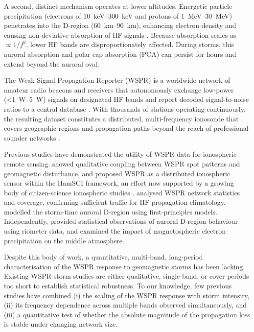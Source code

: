 \documentclass{agujournal2019}
\begin{document}
A second, distinct mechanism operates at lower altitudes. Energetic particle
precipitation (electrons of \SIrange{10}{300}{keV} and protons of
\SIrange{1}{30}{MeV}) penetrates into the D-region (\SIrange{60}{90}{km}),
enhancing electron density and causing non-deviative absorption of HF signals
\citep{hargreaves1969,reid1974}. Because absorption scales as $\propto
	1/f^2$, lower HF bands are disproportionately affected. During storms, this
auroral absorption and polar cap absorption (PCA) can persist for hours and
extend beyond the auroral oval.

The Weak Signal Propagation Reporter (WSPR) is a worldwide network of amateur
radio beacons and receivers that autonomously exchange low-power
(\SI{<1}{W}--\SI{5}{W}) signals on designated HF bands and report decoded
signal-to-noise ratios to a central database \citep{taylor2010}. With thousands
of stations operating continuously, the resulting dataset constitutes a
distributed, multi-frequency ionosonde that covers geographic regions and
propagation paths beyond the reach of professional sounder networks
\citep{frissell2016,labelle2023}.

Previous studies have demonstrated the utility of WSPR data for ionospheric
remote sensing. \citet{frissell2016} showed qualitative coupling between WSPR
spot patterns and geomagnetic disturbance, and proposed WSPR as a distributed
ionospheric sensor within the HamSCI framework, an effort now supported by
a growing body of citizen-science ionospheric studies
\citep{hamsci2023,cerwin2026,potter2026}. \citet{labelle2023} analysed
WSPR network statistics and coverage, confirming sufficient traffic for HF
propagation climatology. \citet{themens2021} modelled the storm-time auroral
D-region using first-principles models. Independently,
\citet{kavanagh2004} provided statistical observations of auroral D-region
behaviour using riometer data, and \citet{rodger2010} examined the impact of
magnetospheric electron precipitation on the middle atmosphere.

Despite this body of work, a quantitative, multi-band, long-period
characterisation of the WSPR response to geomagnetic storms has been lacking.
Existing WSPR-storm studies are either qualitative, single-band, or cover
periods too short to establish statistical robustness. To our knowledge, few
previous studies have combined (i) the scaling of the WSPR response with storm
intensity, (ii) its frequency dependence across multiple bands observed
simultaneously, and (iii) a quantitative test of whether the absolute
magnitude of the propagation loss is stable under changing network size.
\end{document}
